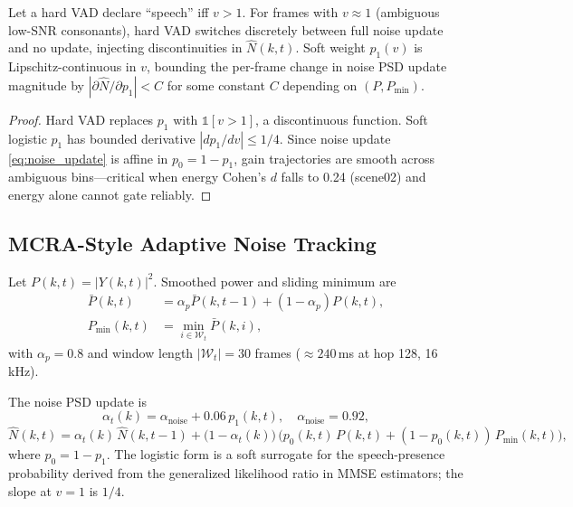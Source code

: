 \begin{proposition}
\label{prop:soft_vad}
Let a hard VAD declare ``speech'' iff $v>1$. For frames with $v\approx 1$ (ambiguous low-SNR consonants), hard VAD switches discretely between full noise update and no update, injecting discontinuities in $\hat{N}(k,t)$. Soft weight $p_1(v)$ is Lipschitz-continuous in $v$, bounding the per-frame change in noise PSD update magnitude by $|\partial \hat{N}/\partial p_1|<C$ for some constant $C$ depending on $(P,P_{\min})$.
\end{proposition}

\begin{proof}
Hard VAD replaces $p_1$ with $\mathbb{1}[v>1]$, a discontinuous function. Soft logistic $p_1$ has bounded derivative $|dp_1/dv|\le 1/4$. Since noise update \eqref{eq:noise_update} is affine in $p_0=1-p_1$, gain trajectories are smooth across ambiguous bins---critical when energy Cohen's $d$ falls to 0.24 (scene02) and energy alone cannot gate reliably.
\end{proof}

\subsection{MCRA-Style Adaptive Noise Tracking}

Let $P(k,t)=|Y(k,t)|^2$. Smoothed power and sliding minimum are
\begin{align}
  \bar{P}(k,t) &= \alpha_p \bar{P}(k,t{-}1) + (1-\alpha_p) P(k,t), \\
  P_{\min}(k,t) &= \min_{i\in\mathcal{W}_t} \bar{P}(k,i),
\end{align}
with $\alpha_p=0.8$ and window length $|\mathcal{W}_t|=30$ frames ($\approx 240$\,ms at hop 128, 16\,kHz).

The noise PSD update is
\begin{equation}
  \alpha_t(k) = \alpha_{\mathrm{noise}} + 0.06\, p_1(k,t), \quad \alpha_{\mathrm{noise}}=0.92,
  \label{eq:adaptive_alpha}
\end{equation}
\begin{equation}
  \hat{N}(k,t) = \alpha_t(k)\,\hat{N}(k,t{-}1)
               + \bigl(1-\alpha_t(k)\bigr)\,\bigl(p_0(k,t)\,P(k,t) + (1-p_0(k,t))\,P_{\min}(k,t)\bigr),
  \label{eq:noise_update}
\end{equation}
where $p_0=1-p_1$. The logistic form is a soft surrogate for the speech-presence probability derived from the generalized likelihood ratio in MMSE estimators; the slope at $v=1$ is $1/4$.

